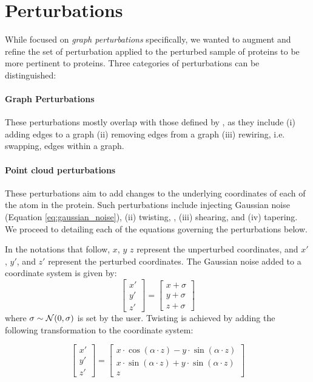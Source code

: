 \section{Perturbations}

While \cite{o2021evaluation} focused on \emph{graph perturbations} specifically,
we wanted to augment and refine the set of perturbation applied to the perturbed
sample of proteins to be more pertinent to proteins. Three
categories of perturbations can be distinguished:

\paragraph{Graph Perturbations} These perturbations mostly overlap with those
defined by \cite{o2021evaluation}, as they include (i) adding edges to a graph
(ii) removing edges from a graph (iii) rewiring, i.e. swapping, edges within a
graph.
\paragraph{Point cloud perturbations} These perturbations aim to add changes
to the underlying coordinates of each of the atom in the protein. Such
perturbations include injecting Gaussian noise (Equation
\ref{eq:gaussian_noise}), (ii) twisting, , (iii) shearing, and
(iv) tapering. We proceed to detailing each of the equations governing the
perturbations below.

In the notations that follow, $x$, $y$ $z$ represent the unperturbed coordinates, and
$x'$, $y'$, and $z'$ represent the perturbed coordinates. The Gaussian noise added to a coordinate system is given by:
\begin{equation}
  \label{eq:gaussian_noise}
  \begin{bmatrix}
    x' \\
    y' \\
    z'
  \end{bmatrix} =
  \begin{bmatrix}
    x + \sigma \\
    y+ \sigma \\
    z+ \sigma
  \end{bmatrix}
\end{equation}
where $\sigma\sim\mathcal{N}(0,\sigma)$ is set by the user. Twisting is achieved by
adding the following transformation to the coordinate system:

\begin{equation}
  \label{eq:twisting}
  \begin{bmatrix}
    x' \\
    y' \\
    z'
  \end{bmatrix} =
  \begin{bmatrix}
    x\cdot\cos(\alpha\cdot z) - y\cdot\sin(\alpha\cdot z) \\
    x\cdot\sin(\alpha\cdot z) + y\cdot\sin(\alpha\cdot z) \\
    z
  \end{bmatrix}
\end{equation}


